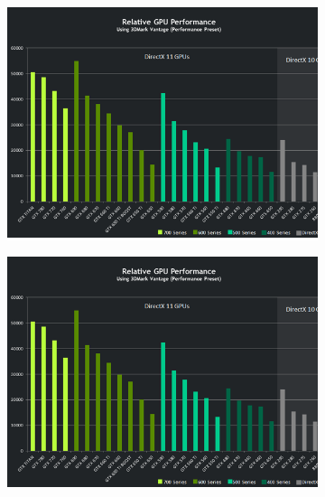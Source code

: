 \documentclass{IEEEtran}
\begin{document}
\begin{figure}[t!]
  \centering
  \begin{subfigure}[b]{0.2\linewidth}
    \includegraphics[width=\linewidth]{Performance.png}
    \end{subfigure}
  \begin{subfigure}[b]{0.2\linewidth}
    \includegraphics[width=\linewidth]{Performance.png}
    \end{subfigure}
  \begin{subfigure}[b]{0.2\linewidth}

\end{subfigure}
\end{figure}
\end{document}
